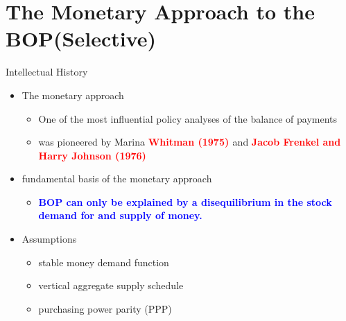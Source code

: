 \documentclass[10pt,hyperref={CJKbookmarks=true},xcolor=dvipsnames,aspectratio=169]{beamer}
\begin{document}
\section{The Monetary Approach to the BOP(Selective)}
\begin{frame}{Intellectual History}

\begin{itemize}
\item The monetary approach

\begin{itemize}
\item One of the most influential policy analyses of the balance of payments 
\item was pioneered by Marina \textbf{\textcolor{red}{Whitman (1975) }}and
\textbf{\textcolor{red}{Jacob Frenkel and Harry Johnson (1976)}}
\end{itemize}
\item fundamental basis of the monetary approach

\begin{itemize}
\item \textbf{\textcolor{blue}{BOP can only be explained by a disequilibrium
in the stock demand for and supply of money.}}
\end{itemize}
\item Assumptions

\begin{itemize}
\item stable money demand function
\item vertical aggregate supply schedule
\item purchasing power parity (PPP)
\end{itemize}
\end{itemize}
\end{frame}
\end{document}
